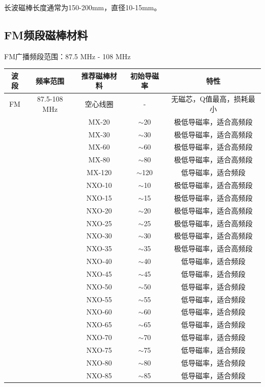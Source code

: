 长波磁棒长度通常为150-200mm，直径10-15mm。

\subsection{FM频段磁棒材料}
\label{sec:fm_magnetic_materials}

FM广播频段范围：87.5 MHz - 108 MHz

\begin{center}
\begin{tabular}{|c|c|c|c|c|}
\hline
\textbf{波段} & \textbf{频率范围} & \textbf{推荐磁棒材料} & \textbf{初始导磁率} & \textbf{特性} \\
\hline
FM & 87.5-108 MHz & 空心线圈 & - & 无磁芯，Q值最高，损耗最小 \\
 & & MX-20 & $\sim$20 & 极低导磁率，适合高频段 \\
 & & MX-30 & $\sim$30 & 极低导磁率，适合高频段 \\
 & & MX-60 & $\sim$60 & 极低导磁率，适合高频段 \\
 & & MX-80 & $\sim$80 & 极低导磁率，适合高频段 \\
 & & MX-120 & $\sim$120 & 低导磁率，适合频段 \\
 & & NXO-10 & $\sim$10 & 极低导磁率，适合高频段 \\
 & & NXO-15 & $\sim$15 & 极低导磁率，适合高频段 \\
 & & NXO-20 & $\sim$20 & 极低导磁率，适合高频段 \\
 & & NXO-25 & $\sim$25 & 极低导磁率，适合高频段 \\
 & & NXO-30 & $\sim$30 & 极低导磁率，适合高频段 \\
 & & NXO-35 & $\sim$35 & 极低导磁率，适合高频段 \\
 & & NXO-40 & $\sim$40 & 低导磁率，适合频段 \\
 & & NXO-45 & $\sim$45 & 低导磁率，适合频段 \\
 & & NXO-50 & $\sim$50 & 低导磁率，适合频段 \\
 & & NXO-55 & $\sim$55 & 低导磁率，适合频段 \\
 & & NXO-60 & $\sim$60 & 低导磁率，适合频段 \\
 & & NXO-65 & $\sim$65 & 低导磁率，适合频段 \\
 & & NXO-70 & $\sim$70 & 低导磁率，适合频段 \\
 & & NXO-75 & $\sim$75 & 低导磁率，适合频段 \\
 & & NXO-80 & $\sim$80 & 低导磁率，适合频段 \\
 & & NXO-85 & $\sim$85 & 低导磁率，适合频段 \\

\end{tabular}
\end{center}
